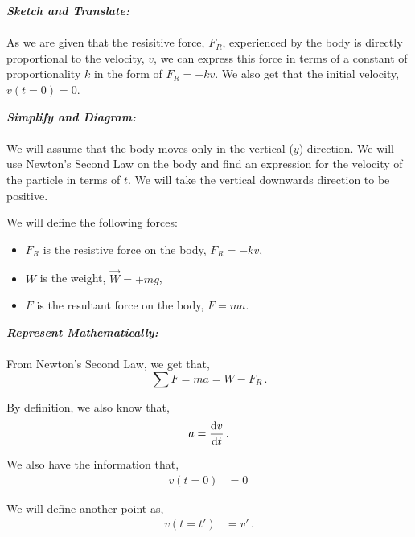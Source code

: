 \begin{subquestions}
\subquestion

\begin{subsubquestions}
	
\subsubquestion

\textbf{\textit{Sketch and Translate:}} \\ \\
As we are given that the resisitive force, $F_R$, experienced by the body is directly proportional to the velocity, $v$, we can express this force in terms of a constant of proportionality $k$ in the form of $F_R=-kv.$ We also get that the initial velocity, $v(t=0)=0$.




\textbf{\textit{Simplify and Diagram:}} \\ \\
We will assume that the body moves only in the vertical ($y$) direction. We will use Newton's Second Law on the body and find an expression for the velocity of the particle in terms of $t$.
We will take the vertical downwards direction to be positive.

We will define the following forces: 
\begin{itemize}
	\item $F_R$ is the resistive force on the body, $F_R=-kv$,
	\item $W$ is the weight, $\vec{W}=+mg$,
	\item $F$ is the resultant force on the body, $F=ma$.
\end{itemize}




\textbf{\textit{Represent Mathematically:}} \\ \\
From Newton's Second Law, we get that, 
\begin{equation}
	\sum F = ma = W - F_R \label{2005:q5:FEqn1} \,.
\end{equation}

By definition, we also know that,
\begin{equation}
	a = \frac{\mathrm{d}v}{\mathrm{d}t} \label{2005:q5:AEqn2} \,.
\end{equation}

We also have the information that,
\begin{align}
	v(t=0) & = 0 \,
\end{align}

We will define another point as,
\begin{align}
	v(t=t') & = v' \,.
\end{align}




\end{subsubquestions}
\end{subquestions}
